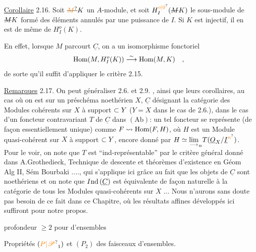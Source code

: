 \uline{Corollaire} 2.16. Soit $\deleted{\unsure{M}}K$ un $A$-module, et soit $H_I^{\unsure{o|0}}(\deleted{M}K)$ le sous-module de $\deleted{M}K$
formé des éléments annulés par une puissance de $I$. Si $K$ est injectif, il
en est de même de $H_I^o(K)$.

En effet, lorsque $M$ parcourt $\underline C$, on a un isomorphisme fonctoriel
\[
\operatorname{Hom}(M,H_I^o(K))\overset{\sim}{\longrightarrow}\operatorname{Hom}(M,K)\quad,
\]
de sorte qu'il suffit d'appliquer le critère 2.15.

\uline{Remarques} 2.17. On peut généraliser 2.6. et 2.9. , ainsi que leurs
corollaires, au cas où on est sur un préschéma noethérien $X$, $\underline C$ désignant
la catégorie des Modules cohérents sur $X$ à support $\subset Y$ ($Y=X$ dans le
cas  de 2.6.), dans le cas d'un foncteur contravariant  $T$ de $\underline C$ dans $(\mathrm{Ab})$:
un tel foncteur  se représente (de façon essentiellement unique) comme $F\leadsto\operatorname{Hom}(F,H)$, où $H$ est un Module quasi-cohérent sur
$X$ à support $\subset Y$, %
encore donné par $\handwritten{H\simeq}\underset{\handwritten{\longrightarrow}}{\lim}_{\handwritten{n}}T(\underline O_X/\underline I^{\handwritten{\unsure{n}}})$. Pour le voir, on note
que $T$ est ``ind-représentable'' par le critère général donné dans A.Grothedieck, Technique de descente et théorèmes d'existence en Géom Alg II,
Sém Bourbaki ...., \handwritten{(}qui s'applique ici grâce au fait que les objets de
$\underline C$ sont noethériens\handwritten{),} et on note que $I\mathrm{nd}\,(\underline C)$ est équivalente de façon naturelle à la catégorie de tous les Modules quasi-cohérents sur $X$ ... Nous
n'aurons sans doute pas besoin de ce fait dans ce Chapitre, où les résultats affines développés ici suffiront pour notre propos.


profondeur $\geq 2$
pour 
d'ensembles

Propriétés $(\unsure{P|\mathscr P}_1)$ et $(P_2)$  des faisceaux d'ensembles.

